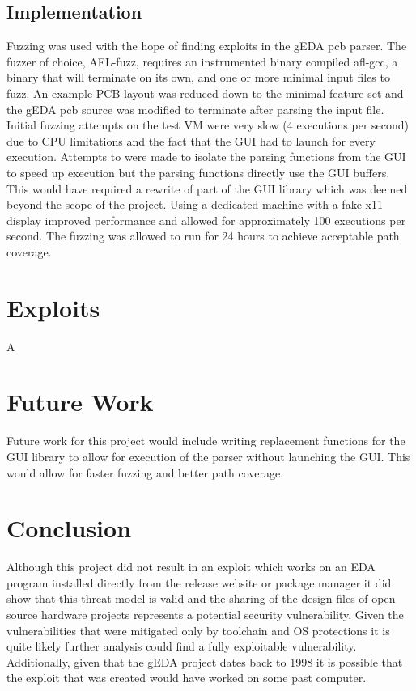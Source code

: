 \documentclass[12pt]{article}
\begin{document}
\subsection{Implementation} 
Fuzzing was used with the hope of finding exploits in the gEDA pcb parser. The fuzzer of choice, AFL-fuzz, requires an instrumented binary compiled afl-gcc, a binary that will terminate on its own, and one or more minimal input files to fuzz. An example PCB layout was reduced down to the minimal feature set and the gEDA pcb source was modified to terminate after parsing the input file. Initial fuzzing attempts on the test VM were very slow (4 executions per second) due to CPU limitations and the fact that the GUI had to launch for every execution. Attempts to were made to isolate the parsing functions from the GUI to speed up execution but the parsing functions directly use the GUI buffers. This would have required a rewrite of part of the GUI library which was deemed beyond the scope of the project. Using a dedicated machine with a fake x11 display improved performance and allowed for approximately 100 executions per second. The fuzzing was allowed to run for 24 hours to achieve acceptable path coverage. 

\section{Exploits}
\label{S:4}
A 

\section{Future Work}
\label{S:5}
Future work for this project would include writing replacement functions for the GUI library to allow for execution of the parser without launching the GUI. This would allow for faster fuzzing and better path coverage. 

\section{Conclusion}
\label{S:6}
Although this project did not result in an exploit which works on an EDA program installed directly from the release website or package manager it did show that this threat model is valid and the sharing of the design files of open source hardware projects represents a potential security vulnerability. Given the vulnerabilities that were mitigated only by toolchain and OS protections it is quite likely further analysis could find a fully exploitable vulnerability. Additionally, given that the gEDA project dates back to 1998 it is possible that the exploit that was created would have worked on some past computer. 
\end{document}
